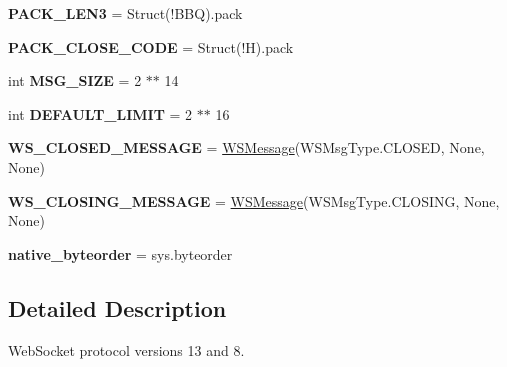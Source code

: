 \begin{DoxyCompactItemize}
\item 
\mbox{\label{namespaceaiohttp_1_1http__websocket_a8e842995172b8f079ee2a9d93a9b2fdc}} 
{\bfseries P\+A\+C\+K\+\_\+\+L\+E\+N3} = Struct(\textquotesingle{}!B\+BQ\textquotesingle{}).pack
\item 
\mbox{\label{namespaceaiohttp_1_1http__websocket_a474c9f18a2e71ffdde97c227124997bb}} 
{\bfseries P\+A\+C\+K\+\_\+\+C\+L\+O\+S\+E\+\_\+\+C\+O\+DE} = Struct(\textquotesingle{}!H\textquotesingle{}).pack
\item 
\mbox{\label{namespaceaiohttp_1_1http__websocket_a80d564768019991c30648a67545d2164}} 
int {\bfseries M\+S\+G\+\_\+\+S\+I\+ZE} = 2 $\ast$$\ast$ 14
\item 
\mbox{\label{namespaceaiohttp_1_1http__websocket_a6712753b6c74c61aba861215118cddd0}} 
int {\bfseries D\+E\+F\+A\+U\+L\+T\+\_\+\+L\+I\+M\+IT} = 2 $\ast$$\ast$ 16
\item 
\mbox{\label{namespaceaiohttp_1_1http__websocket_afdf07a7e232194cc59108715106c08c6}} 
{\bfseries W\+S\+\_\+\+C\+L\+O\+S\+E\+D\+\_\+\+M\+E\+S\+S\+A\+GE} = \hyperlink{classaiohttp_1_1http__websocket_1_1_w_s_message}{W\+S\+Message}(W\+S\+Msg\+Type.\+C\+L\+O\+S\+ED, None, None)
\item 
\mbox{\label{namespaceaiohttp_1_1http__websocket_aaddabbb42420a2ae44c8e4041b94d072}} 
{\bfseries W\+S\+\_\+\+C\+L\+O\+S\+I\+N\+G\+\_\+\+M\+E\+S\+S\+A\+GE} = \hyperlink{classaiohttp_1_1http__websocket_1_1_w_s_message}{W\+S\+Message}(W\+S\+Msg\+Type.\+C\+L\+O\+S\+I\+NG, None, None)
\item 
\mbox{\label{namespaceaiohttp_1_1http__websocket_ad0af940d4edebba41a41e6ce7f3e1092}} 
{\bfseries native\+\_\+byteorder} = sys.\+byteorder
\end{DoxyCompactItemize}


\subsection{Detailed Description}
\begin{DoxyVerb}WebSocket protocol versions 13 and 8.\end{DoxyVerb}
 